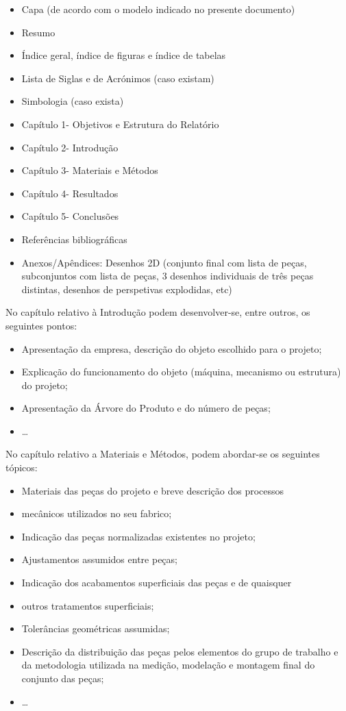\begin{itemize}
    \item	Capa (de acordo com o modelo indicado no presente documento)
    \item	Resumo
    \item	Índice geral, índice de figuras e índice de tabelas
    \item	Lista de Siglas e de Acrónimos (caso existam)
    \item	Simbologia (caso exista)
    \item	Capítulo 1- Objetivos e Estrutura do Relatório
    \item	Capítulo 2- Introdução
    \item	Capítulo 3- Materiais e Métodos
    \item	Capítulo 4- Resultados
    \item	Capítulo 5- Conclusões
    \item	Referências bibliográficas
    \item	Anexos/Apêndices: Desenhos 2D (conjunto final com lista de peças, subconjuntos com lista de peças, 3 desenhos individuais de três peças distintas, desenhos de perspetivas explodidas, etc)
\end{itemize}

No capítulo relativo à Introdução podem desenvolver-se, entre outros, os
seguintes pontos:

\begin{itemize}
    \item Apresentação da empresa, descrição do objeto escolhido para o projeto;
    \item Explicação do funcionamento do objeto (máquina, mecanismo ou
    estrutura) do projeto;
    \item Apresentação da Árvore do Produto e do número de peças;
    \item	\ldots
\end{itemize}

No capítulo relativo a Materiais e Métodos, podem abordar-se os seguintes
tópicos:

\begin{itemize}
    \item Materiais das peças do projeto e breve descrição dos processos
    \item mecânicos utilizados no seu fabrico;
    \item Indicação das peças normalizadas existentes no projeto;
    \item Ajustamentos assumidos entre peças;
    \item Indicação dos acabamentos superficiais das peças e de quaisquer
    \item outros tratamentos superficiais;
    \item Tolerâncias geométricas assumidas;
    \item Descrição da distribuição das peças pelos elementos do grupo de trabalho e da metodologia utilizada na medição, modelação e montagem final do conjunto das peças;
    \item 	\ldots
\end{itemize}

